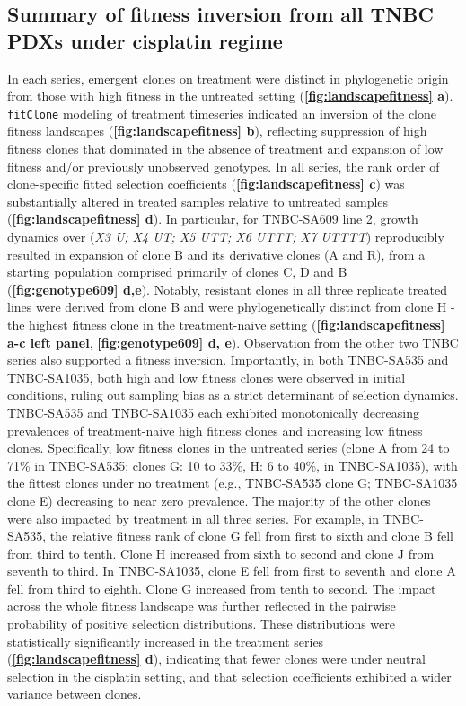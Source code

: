 \subsection{Summary of fitness inversion from all TNBC PDXs under cisplatin regime}
In each series, emergent clones on treatment were distinct in phylogenetic origin from those with high fitness in the untreated setting (\textbf{\autoref{fig:landscapefitness} a}). \texttt{fitClone} modeling of treatment timeseries indicated an inversion of the clone fitness landscapes (\textbf{\autoref{fig:landscapefitness} b}), reflecting suppression of high fitness clones that dominated in the absence of treatment and expansion of low fitness and/or previously unobserved genotypes. In all series, the rank order of clone-specific fitted selection coefficients (\textbf{\autoref{fig:landscapefitness} c}) was substantially altered in treated samples relative to untreated samples (\textbf{\autoref{fig:landscapefitness} d}). In particular, for TNBC-SA609 line 2, growth dynamics over (\textit{X3 U; X4 UT; X5 UTT; X6 UTTT; X7 UTTTT}) reproducibly resulted in expansion of clone B and its derivative clones (A and R), from a starting population comprised primarily of clones C, D and B (\textbf{\autoref{fig:genotype609} d,e}). Notably, resistant clones in all three replicate treated lines were derived from clone B and were phylogenetically distinct from clone H - the highest fitness clone in the treatment-naive setting  (\textbf{\autoref{fig:landscapefitness} a-c left panel}, \textbf{\autoref{fig:genotype609} d, e}). Observation from the other two TNBC series also supported a fitness inversion. Importantly, in both TNBC-SA535 and TNBC-SA1035, both high and low fitness clones were observed in initial conditions, ruling out sampling bias as a strict determinant of selection dynamics. TNBC-SA535 and TNBC-SA1035 each exhibited monotonically decreasing prevalences of treatment-naive high fitness clones and increasing low fitness clones. Specifically, low fitness clones in the untreated series (clone A from 24 to 71\% in TNBC-SA535; clones G: 10 to 33\%, H: 6 to 40\%, in TNBC-SA1035), with the fittest clones under no treatment (e.g., TNBC-SA535 clone G; TNBC-SA1035 clone E) decreasing to near zero prevalence. The majority of the other clones were also impacted by treatment in all three series. For example, in TNBC-SA535, the relative fitness rank of clone G fell from first to sixth and clone B fell from third to tenth. Clone H increased from sixth to second and clone J from seventh to third. In TNBC-SA1035, clone E fell from first to seventh and clone A fell from third to eighth. Clone G increased from tenth to second. The impact across the whole fitness landscape was further reflected in the pairwise probability of positive selection distributions. These distributions were statistically significantly increased in the treatment series  (\textbf{\autoref{fig:landscapefitness} d}), indicating that fewer clones were under neutral selection in the cisplatin setting, and that selection coefficients exhibited a wider variance between clones. 
